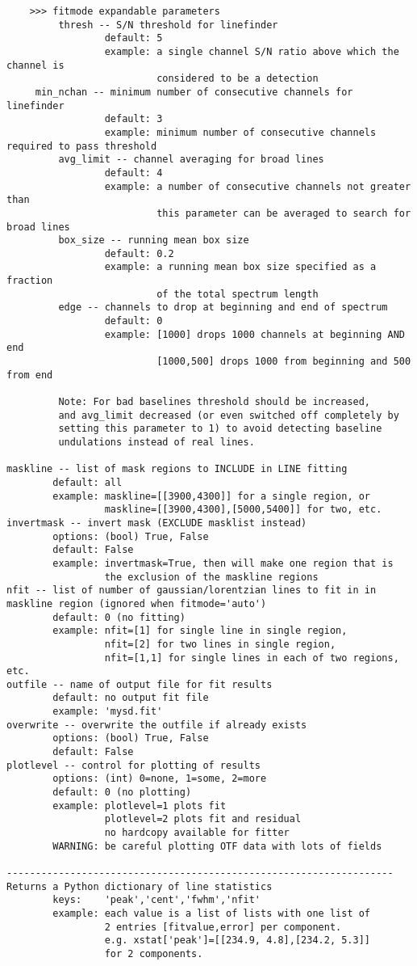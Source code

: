 \begin{verbatim}
    >>> fitmode expandable parameters             
         thresh -- S/N threshold for linefinder
                 default: 5
                 example: a single channel S/N ratio above which the channel is
                          considered to be a detection
	 min_nchan -- minimum number of consecutive channels for linefinder
       	         default: 3
                 example: minimum number of consecutive channels required to pass threshold
         avg_limit -- channel averaging for broad lines
                 default: 4
                 example: a number of consecutive channels not greater than
                          this parameter can be averaged to search for broad lines
         box_size -- running mean box size
                 default: 0.2
                 example: a running mean box size specified as a fraction
                          of the total spectrum length
         edge -- channels to drop at beginning and end of spectrum
                 default: 0
                 example: [1000] drops 1000 channels at beginning AND end
                          [1000,500] drops 1000 from beginning and 500 from end

         Note: For bad baselines threshold should be increased,
         and avg_limit decreased (or even switched off completely by
         setting this parameter to 1) to avoid detecting baseline
         undulations instead of real lines.

maskline -- list of mask regions to INCLUDE in LINE fitting
        default: all
        example: maskline=[[3900,4300]] for a single region, or
                 maskline=[[3900,4300],[5000,5400]] for two, etc.
invertmask -- invert mask (EXCLUDE masklist instead)
        options: (bool) True, False
        default: False
        example: invertmask=True, then will make one region that is
                 the exclusion of the maskline regions
nfit -- list of number of gaussian/lorentzian lines to fit in in maskline region (ignored when fitmode='auto')
        default: 0 (no fitting)
        example: nfit=[1] for single line in single region,
                 nfit=[2] for two lines in single region,
                 nfit=[1,1] for single lines in each of two regions, etc.
outfile -- name of output file for fit results
        default: no output fit file
        example: 'mysd.fit'
overwrite -- overwrite the outfile if already exists
        options: (bool) True, False
        default: False
plotlevel -- control for plotting of results
        options: (int) 0=none, 1=some, 2=more
        default: 0 (no plotting)
        example: plotlevel=1 plots fit
                 plotlevel=2 plots fit and residual 
                 no hardcopy available for fitter
        WARNING: be careful plotting OTF data with lots of fields

-------------------------------------------------------------------
Returns a Python dictionary of line statistics
        keys:    'peak','cent','fwhm','nfit'
        example: each value is a list of lists with one list of
                 2 entries [fitvalue,error] per component.
                 e.g. xstat['peak']=[[234.9, 4.8],[234.2, 5.3]]
                 for 2 components.

\end{verbatim}

